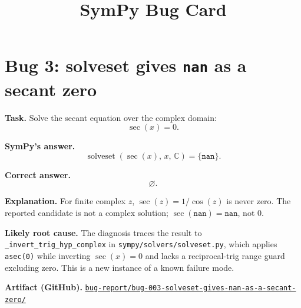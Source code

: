 \documentclass[11pt]{article}
\title{SymPy Bug Card}
\author{}
\date{}
\newcommand{\artifactrepo}{https://github.com/TODO-org/TODO-repo}
\newcommand{\bugbundle}[1]{\href{\artifactrepo/tree/main/bug-report/#1}{\nolinkurl{bug-report/#1/}}}
\begin{document}
\maketitle

\section*{Bug 3: solveset gives \texttt{nan} as a secant zero}

\begin{counterexamplebox}
\textbf{Task.} Solve the secant equation over the complex domain:
\[
    \sec(x)=0.
\]

\medskip
\textbf{SymPy's answer.}
\[
    \operatorname{solveset}(\sec(x),\,x,\,\mathbb{C})=\{\mathtt{nan}\}.
\]

\medskip
\textbf{Correct answer.}
\[
    \varnothing.
\]

\medskip
\textbf{Explanation.} For finite complex \(z\), \(\sec(z)=1/\cos(z)\) is never
zero. The reported candidate is not a complex solution;
\(\sec(\mathtt{nan})=\mathtt{nan}\), not \(0\).

\medskip
\textbf{Likely root cause.} The diagnosis traces the result to
\texttt{\_invert\_trig\_hyp\_complex} in
\nolinkurl{sympy/solvers/solveset.py}, which applies \texttt{asec(0)} while
inverting \(\sec(x)=0\) and lacks a reciprocal-trig range guard excluding zero.
This is a new instance of a known failure mode.

\medskip
\textbf{Artifact (GitHub).} \bugbundle{bug-003-solveset-gives-nan-as-a-secant-zero}
\end{counterexamplebox}
\end{document}
